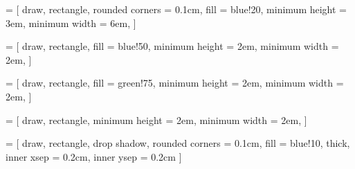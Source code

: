  =
[
	draw,
	rectangle,
	rounded corners	= 0.1cm,
	fill			= blue!20,
	minimum height	= 3em,
	minimum width   = 6em,
]

 =
[
	draw,
	rectangle,
	fill			= blue!50,
	minimum height	= 2em,
	minimum width	= 2em,
]

 =
[
	draw,
	rectangle,
	fill			= green!75,
	minimum height	= 2em,
	minimum width	= 2em,
]

 =
[
	draw,
	rectangle,
	minimum height	= 2em,
	minimum width	= 2em,
]

 =
[
	draw,
	rectangle,
	drop shadow,
	rounded corners	= 0.1cm,
	fill			= blue!10,
	thick,
	inner xsep		= 0.2cm,		%
	inner ysep		= 0.2cm 		%
]
